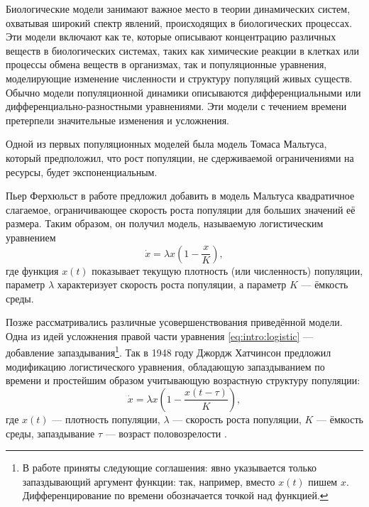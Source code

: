 
{\actuality} Биологические модели занимают важное место в теории динамических систем, охватывая широкий спектр явлений, происходящих в биологических процессах. Эти модели включают как те, которые описывают концентрацию различных веществ в биологических системах, таких как химические реакции в клетках или процессы обмена веществ в организмах, так и популяционные уравнения, моделирующие изменение численности и структуру популяций живых существ. Обычно модели популяционной динамики описываются дифференциальными или дифференциально-разностными уравнениями. 
Эти модели с течением времени претерпели значительные изменения и усложнения.

Одной из первых популяционных моделей была модель Томаса Мальтуса, который предположил, что рост популяции, не сдерживаемой ограничениями на ресурсы, будет экспоненциальным. %

Пьер Ферхюльст в работе \cite{Verhulst1838} предложил добавить в модель Мальтуса квадратичное слагаемое, ограничивающее скорость роста популяции для больших значений её размера. Таким образом, он получил модель, называемую логистическим уравнением
\begin{equation}
\label{eq:intro:logistic}
	\dot{x}=\lambda x\left(1-\frac{x}{K}\right),
\end{equation}
где функция $x(t)$ показывает текущую плотность (или численность) популяции, параметр $\lambda$ характеризует скорость роста популяции, а параметр $K$ --- ёмкость среды.

Позже рассматривались различные усовершенствования приведённой модели. Одна из идей усложнения правой части уравнения \eqref{eq:intro:logistic} --- добавление запаздывания\footnote{В работе приняты следующие соглашения: явно указывается только запаздывающий аргумент функции: так, например, вместо $x(t)$ пишем $x$. Дифференцирование по времени обозначается точкой над функцией.}. Так в 1948 году Джордж Хатчинсон предложил модификацию логистического уравнения, обладающую запаздыванием по времени и простейшим образом учитывающую возрастную структуру популяции:
%
\begin{equation}
\label{eq:intro:hutch}
	\dot{x}=\lambda x\left(1 - \frac{x(t-\tau)}{K}\right),
\end{equation}
%
где $x(t)$ --- плотность популяции, $\lambda$ --- скорость роста популяции, $K$ --- ёмкость среды, запаздывание $\tau$ --- возраст половозрелости \cite{Hutchinson1948}. %


